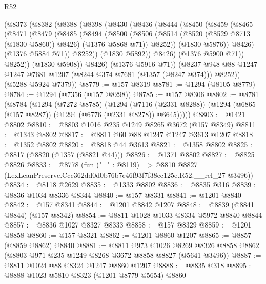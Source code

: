 \begin{lexlean}{R52}
\begin{coremodule}
      (@8373
        (@8382
          (@8388
            (@8398
              (@8430
                (@8436
                  (@8444
                    (@8450
                      (@8459
                        (@8465
                          (@8471
                            (@8479
                              (@8485
                                (@8494
                                  (@8500
                                    (@8506
                                      (@8514
                                        (@8520 (@8529 @8713 (@1830 @5860)) @8426)
                                        (@1376 @5868 @71))
                                      @8252))
                                  (@1830 @5876))
                                @8426)
                              (@1376 @5884 @71))
                            @8252))
                        (@1830 @5892))
                      @8426)
                    (@1376 @5900 @71))
                  @8252))
              (@1830 @5908))
            @8426)
          (@1376 @5916 @71))
        (@8237 @948 @88 @1247 @1247 @7681 @1207 (@8244 @374 @7681 (@1357 (@8247 @374))) @8252))
      (@5288 @5924 @7379))
@8779 := @157 @8319
@8781 := @1294 (@8105 @8779)
@8784 := @1294 (@7356 (@157 @8298))
@8785 := @157 @8306
@8802 := @8781
    (@8784
      (@1294
        (@7272 @8785)
        (@1294
          (@7116 (@2331 @8288))
          (@1294 (@6865 (@157 @8287)) (@1294 (@6776 (@2331 @8278)) @6645)))))
@8803 := @1421 @8802
@8810 := @8803 @1016 @235 @1249 @8265 @3672 (@157 @8349)
@8811 := @1343 @8802
@8817 := @8811 @60 @88 @1247 @1247 @3613 @1207
@8818 := @1352 @8802
@8820 := @8818 @44 @3613
@8821 := @1358 @8802
@8825 := @8817 (@8820 (@1357 (@8821 @44)))
@8826 := @1371 @8802
@8827 := @8825 @8826
@8833 := @8778
    (fun ("_" : @8119) =>
    @8810 @8827 (LexLeanPreserve.Ccc362dd0d0b76b7c46f93f7f38ec125e.R52.__rel_27 @3496))
@8834 := @8118 @2629
@8835 := @1333 @8802
@8836 := @8835 @316
@8839 := @8836 @1034 @8336 @8344
@8840 := @157 @8331
@8841 := @1201 @8840
@8842 := @157 @8341
@8844 := @1201 @8842 @1207
@8848 := @8839 (@8841 @8844) (@157 @8342)
@8854 := @8811 @1028 @1033 @8334 @5972 @8840 @8844
@8857 := @8836 @1027 @8327 @8333
@8858 := @157 @8329
@8859 := @1201 @8858
@8860 := @157 @8321
@8862 := @1201 @8860 @1207
@8865 := @8857 (@8859 @8862) @8840
@8881 := @8811
    @973
    @1026
    @8269
    @8326
    @8858
    @8862
    (@8803 @971 @235 @1249 @8268 @3672 @8858 @8827 (@5641 @3496))
@8887 := @8811 @1024 @88 @8324 @1247 @8860 @1207
@8888 := @8835 @318
@8895 := @8888 @1023 @5810 @8323 (@1201 @8779 @5654) @8860

\end{coremodule}
\end{lexlean}
